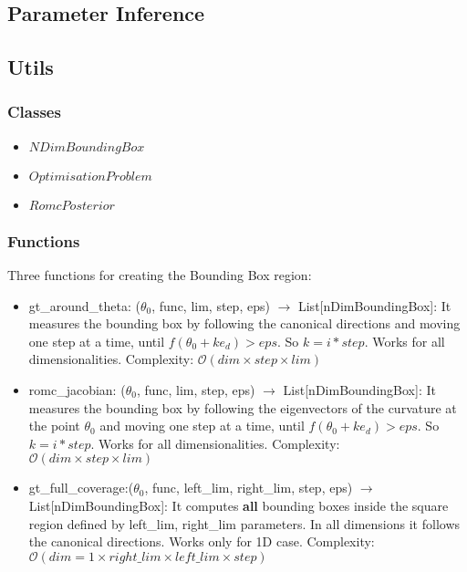 \documentclass{article}
\begin{document}
\subsection{Parameter Inference}

\subsection{Utils}

\subsubsection{Classes}

\begin{itemize}
\item $NDimBoundingBox$
\item $OptimisationProblem$
  \item $RomcPosterior$
  \end{itemize}


\subsubsection{Functions}

Three functions for creating the Bounding Box region:

\begin{itemize}
  \item gt\_around\_theta: ($\theta_0$, func, lim, step, eps) $\rightarrow$ List[nDimBoundingBox]: It measures the bounding box by following the canonical directions and moving one step at a time, until $f(\theta_0 + ke_d) > eps$. So $k=i*step$. Works for all dimensionalities. Complexity: $\mathcal{O}(dim \times step \times lim)$
  
  \item romc\_jacobian: ($\theta_0$, func, lim, step, eps) $\rightarrow$ List[nDimBoundingBox]: It measures the bounding box by following the eigenvectors of the curvature at the point $\theta_0$ and moving one step at a time, until $f(\theta_0 + ke_d) > eps$. So $k=i*step$. Works for all dimensionalities. Complexity: $\mathcal{O}(dim \times step \times lim)$

  \item gt\_full\_coverage:($\theta_0$, func, left\_lim, right\_lim, step, eps) $\rightarrow$ List[nDimBoundingBox]: It computes \textbf{all} bounding boxes inside the square region defined by left\_lim, right\_lim parameters. In all dimensions it follows the canonical directions. Works only for 1D case. Complexity: $\mathcal{O}(dim=1 \times right\_lim \times left\_lim \times step)$
  \end{itemize}
\end{document}
